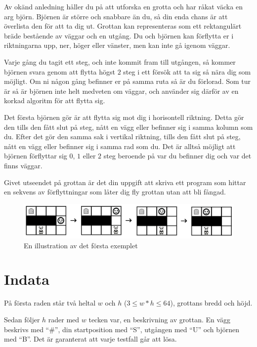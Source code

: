 Av okänd anledning håller du på att utforska en grotta och har råkat väcka en arg björn.
Björnen är större och snabbare än du, så din enda chans är att överlista den för att ta dig ut.
Grottan kan representeras som ett rektangulärt bräde bestående av väggar och en utgång.
Du och björnen kan förflytta er i riktningarna upp, ner, höger eller vänster, men kan inte gå igenom väggar.

Varje gång du tagit ett steg, och inte kommit fram till utgången, så kommer björnen svara genom att flytta
högst $2$ steg i ett försök att ta sig så nära dig som möjligt. Om ni någon gång befinner er på samma ruta så är du förlorad.
Som tur är så är björnen inte helt medveten om väggar, och använder sig därför av en korkad algoritm för att flytta sig.

Det första björnen gör är att flytta sig mot dig i horisontell riktning. Detta gör den tills den fått slut på steg,
nått en vägg eller befinner sig i samma kolumn som du. Efter det gör den samma sak i vertikal riktning,
tills den fått slut på steg, nått en vägg eller befinner sig i samma rad som du. Det är alltså möjligt att björnen
förflyttar sig $0$, $1$ eller $2$ steg beroende på var du befinner dig och var det finns väggar.

Givet utseendet på grottan är det din uppgift att skriva ett program som hittar en sekvens av förflyttningar som låter dig fly grottan utan att bli fångad.

\begin{figure}[ht!]
\centering
\includegraphics[width=\textwidth]{grottflykt.png}
\caption{En illustration av det första exemplet}
\label{overflow}
\end{figure}

\section*{Indata}
På första raden står två heltal $w$ och $h$ ($ 3 \leq w*h \leq 64$), grottans bredd och höjd.

Sedan följer $h$ rader med $w$ tecken var, en beskrivning av grottan. En vägg beskrivs med ``\#'', din startposition med ``S'',
utgången med ``U'' och björnen med ``B''. Det är garanterat att varje testfall går att lösa. 

